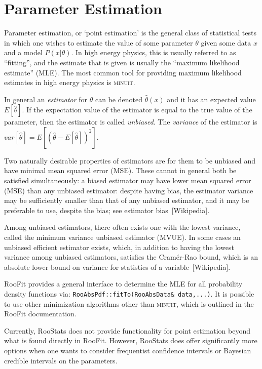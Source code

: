 \documentclass[11pt]{article}
\begin{document}
\section{Parameter Estimation}

Parameter estimation, or `point estimation' is the general class of statistical tests in which one wishes to estimate the value of some parameter $\theta$ given some data $x$ and a model $P(x|\theta)$.  In high energy physics, this is usually referred to as ``fitting'', and the estimate that is given is usually the ``maximum likelihood estimate'' (MLE).  The most common tool for providing maximum likelihood estimates in high energy physics is \textsc{minuit}.

In general an \textit{estimator} for $\theta$ can be denoted $\hat{\theta}(x)$ and it has an expected value $E[\hat{\theta}]$.  If the expectation value of the estimator is equal to the true value of the parameter, then the estimator is called \textit{unbiased}.   The \textit{variance} of the estimator is $var[\hat\theta] = E[ (\hat\theta - E[\hat\theta])^2]$.  

Two naturally desirable properties of estimators are for them to be unbiased and have minimal mean squared error (MSE). These cannot in general both be satisfied simultaneously: a biased estimator may have lower mean squared error (MSE) than any unbiased estimator: despite having bias, the estimator variance may be sufficiently smaller than that of any unbiased estimator, and it may be preferable to use, despite the bias; see estimator bias~[Wikipedia].

Among unbiased estimators, there often exists one with the lowest variance, called the minimum variance unbiased estimator (MVUE). In some cases an unbiased efficient estimator exists, which, in addition to having the lowest variance among unbiased estimators, satisfies the Cram\'er-Rao bound, which is an absolute lower bound on variance for statistics of a variable~[Wikipedia].

RooFit provides a general interface to determine the MLE for all probability density functions via: \texttt{RooAbsPdf::fitTo(RooAbsData\& data,...)}.  It is possible to use other minimization algorithms other than \textsc{minuit}, which is outlined in the RooFit documentation.

Currently, RooStats does not provide functionality for point estimation beyond what is found directly in RooFit.  However, RooStats does offer significantly more options when one wants to consider frequentist confidence intervals or Bayesian credible intervals on the parameters.
\end{document}
